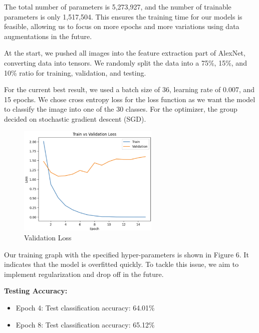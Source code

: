 \documentclass{article} %
\begin{document}
The total number of parameters is 5,273,927, and the number of trainable parameters is only 1,517,504. This ensures the training time for our models is feasible, allowing us to focus on more epochs and more variations using data augmentations in the future.

At the start, we pushed all images into the feature extraction part of AlexNet, converting data into tensors. We randomly split the data into a 75\%, 15\%, and 10\% ratio for training, validation, and testing.

For the current best result, we used a batch size of 36, learning rate of 0.007, and 15 epochs. We chose cross entropy loss for the loss function as we want the model to classify the image into one of the 30 classes. For the optimizer, the group decided on stochastic gradient descent (SGD).

\FloatBarrier

\begin{figure}[h]
    \begin{center}
    \includegraphics[width=0.6\textwidth]{figures/validationLossGraph.png}
    \end{center}
    \caption{Validation Loss}
\end{figure}

\FloatBarrier

Our training graph with the specified hyper-parameters is shown in Figure 6. It indicates that the model is overfitted quickly. To tackle this issue, we aim to implement regularization and drop off in the future.

\textbf{Testing Accuracy:}
\begin{itemize}
    \item Epoch 4: Test classification accuracy: 64.01\%
    \item Epoch 8: Test classification accuracy: 65.12\%
\end{itemize}
\end{document}
